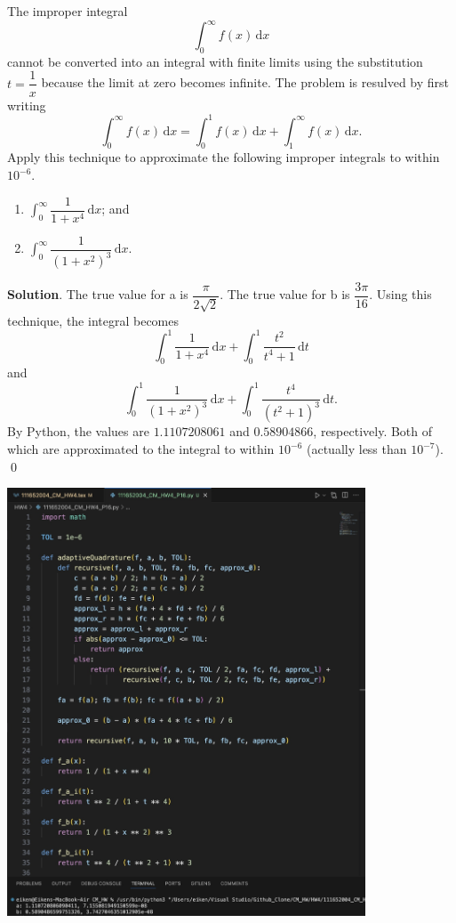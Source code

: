 \documentclass[11pt]{article}
\theoremstyle{break}
\newcommand{\ddi}{\text{$\,$d}}
\numberwithin{equation}{theorem}
\begin{document}
\newpage
\begin{problem}\label{problem 16} %
    The improper integral $$\int_{0}^{\infty}f(x)\ddi x$$ cannot be converted into an integral with finite limits using the substitution $t=\dfrac{1}{x}$ because the limit at zero becomes infinite. The problem is resulved by first writing $$\int_{0}^{\infty}f(x)\ddi x=\int_{0}^{1}f(x)\ddi x+\int_{1}^{\infty}f(x)\ddi x.$$ Apply this technique to approximate the following improper integrals to within $10^{-6}$. \vspace{-1em}
    \begin{multicols}{2}
        \begin{enumerate}
            \item $\displaystyle\int_{0}^{\infty}\dfrac{1}{1+x^4}\ddi x$; and
            \item $\displaystyle\int_{0}^{\infty}\dfrac{1}{(1+x^2)^3}\ddi x$.
        \end{enumerate}
    \end{multicols}
    \vspace{0.1em}
\end{problem}
\textbf{Solution}. The true value for a is $\dfrac{\pi}{2\sqrt{2}}$. The true value for b is $\dfrac{3\pi}{16}$. Using this technique, the integral becomes $$\int_{0}^{1}\dfrac{1}{1+x^4}\ddi x+\int_{0}^{1}\dfrac{t^2}{t^4+1}\ddi t$$ and $$\int_{0}^{1}\dfrac{1}{(1+x^2)^3}\ddi x+\int_{0}^{1}\dfrac{t^4}{(t^2+1)^3}\ddi t.$$ By Python, the values are $1.1107208061$ and $0.58904866$, respectively. Both of which are approximated to the integral to within $10^{-6}$ (actually less than $10^{-7}$). \qed

\begin{center}
    \includegraphics[width=0.8\textwidth]{P16.jpg}
\end{center}
\end{document}
